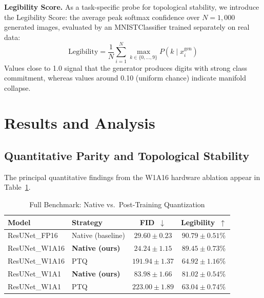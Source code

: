 \documentclass[twocolumn, journal]{IEEEtran}
\begin{document}
\textbf{Legibility Score.} As a task-specific probe for topological stability, we
introduce the Legibility Score: the average peak softmax confidence over $N=1{,}000$
generated images, evaluated by an MNISTClassifier trained separately on real data:
\begin{equation}
  \text{Legibility} = \frac{1}{N}\sum_{i=1}^{N}
  \max_{k\in\{0,\ldots,9\}} P\!\left(k \mid x_i^{\text{gen}}\right)
  \label{eq:legibility}
\end{equation}
Values close to 1.0 signal that the generator produces digits with strong class
commitment, whereas values around 0.10 (uniform chance) indicate manifold collapse.

\section{Results and Analysis}

\subsection{Quantitative Parity and Topological Stability}

The principal quantitative findings from the W1A16 hardware ablation appear in
Table~\ref{tab:main}.

\begin{table}[h]
\centering
\caption{Full Benchmark: Native vs.\ Post-Training Quantization}
\label{tab:main}
\begin{tabular}{@{}llcc@{}}
\toprule
\textbf{Model} & \textbf{Strategy} & \textbf{FID~$\downarrow$} &
\textbf{Legibility~$\uparrow$} \\
\midrule
ResUNet\_FP16  & Native (baseline) & $29.60 \pm 0.23$  & $90.79 \pm 0.51$\% \\
ResUNet\_W1A16 & \textbf{Native (ours)} & $\mathbf{24.24 \pm 1.15}$  & $\mathbf{89.45 \pm 0.73}$\% \\
ResUNet\_W1A16 & PTQ               & $191.94 \pm 1.37$ & $64.92 \pm 1.16$\% \\
\midrule
ResUNet\_W1A1  & \textbf{Native (ours)} & $\mathbf{83.98 \pm 1.66}$  & $\mathbf{81.02 \pm 0.54}$\% \\
ResUNet\_W1A1  & PTQ               & $223.00 \pm 1.89$ & $63.04 \pm 0.74$\% \\
\bottomrule
\end{tabular}
\end{table}
\end{document}
